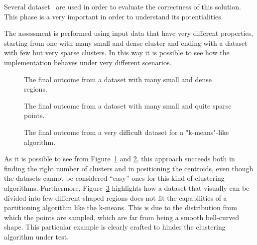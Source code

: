 \label{experiments}
Several dataset~\cite{ClusteringDatasets} are used in order to evaluate the correctness 
of this solution. This phase is a very important in order to understand its potentialities.

The assessment is performed using input data that have very different properties,
starting from one with many small and dense cluster and ending with a dataset with few 
but very sparse clusters. In this way it is possible to see how the implementation
behaves under very different scenarios.

\begin{figure}[t]
  \caption{The final outcome from a dataset with many small and dense regions.}
  \label{dataset1}
\end{figure}

\begin{figure}[t]
  \caption{The final outcome from a dataset with many small and quite sparse points.}
  \label{dataset2}
\end{figure}

\begin{figure}[t]
  \caption{The final outcome from a very difficult dataset for a "k-means"-like algorithm.}
  \label{dataset3}
\end{figure}

As it is possible to see from Figure~\ref{dataset1} and \ref{dataset2}, this approach
succeeds both in finding the right number of clusters and in positioning the centroids, even
though the datasets cannot be considered ``easy'' ones for this kind of clustering
algorithms. 
Furthermore, Figure~\ref{dataset3} highlights how a dataset that visually can be 
divided into few different-shaped regions does not fit the capabilities of a partitioning
algorithm like the k-means. This is due to the distribution from which the points are
sampled, which are far from being a smooth bell-curved shape.
This particular example is clearly crafted to hinder the clustering algorithm under test.
